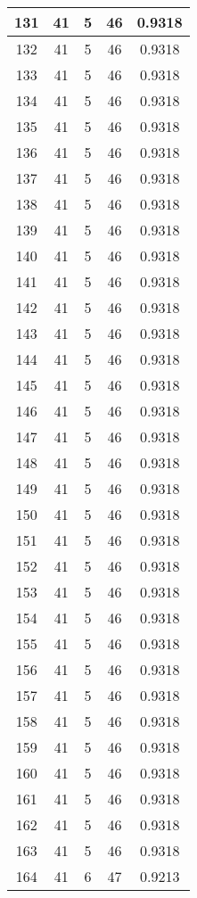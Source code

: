 \documentclass[letterpaper, 12pt]{article}
\begin{document}
\begin{longtable}{|c|c|c|c|c|}
\hline
131 & 41 & 5 & 46 & 0.9318 \\
\hline
132 & 41 & 5 & 46 & 0.9318 \\
\hline
133 & 41 & 5 & 46 & 0.9318 \\
\hline
134 & 41 & 5 & 46 & 0.9318 \\
\hline
135 & 41 & 5 & 46 & 0.9318 \\
\hline
136 & 41 & 5 & 46 & 0.9318 \\
\hline
137 & 41 & 5 & 46 & 0.9318 \\
\hline
138 & 41 & 5 & 46 & 0.9318 \\
\hline
139 & 41 & 5 & 46 & 0.9318 \\
\hline
140 & 41 & 5 & 46 & 0.9318 \\
\hline
141 & 41 & 5 & 46 & 0.9318 \\
\hline
142 & 41 & 5 & 46 & 0.9318 \\
\hline
143 & 41 & 5 & 46 & 0.9318 \\
\hline
144 & 41 & 5 & 46 & 0.9318 \\
\hline
145 & 41 & 5 & 46 & 0.9318 \\
\hline
146 & 41 & 5 & 46 & 0.9318 \\
\hline
147 & 41 & 5 & 46 & 0.9318 \\
\hline
148 & 41 & 5 & 46 & 0.9318 \\
\hline
149 & 41 & 5 & 46 & 0.9318 \\
\hline
150 & 41 & 5 & 46 & 0.9318 \\
\hline
151 & 41 & 5 & 46 & 0.9318 \\
\hline
152 & 41 & 5 & 46 & 0.9318 \\
\hline
153 & 41 & 5 & 46 & 0.9318 \\
\hline
154 & 41 & 5 & 46 & 0.9318 \\
\hline
155 & 41 & 5 & 46 & 0.9318 \\
\hline
156 & 41 & 5 & 46 & 0.9318 \\
\hline
157 & 41 & 5 & 46 & 0.9318 \\
\hline
158 & 41 & 5 & 46 & 0.9318 \\
\hline
159 & 41 & 5 & 46 & 0.9318 \\
\hline
160 & 41 & 5 & 46 & 0.9318 \\
\hline
161 & 41 & 5 & 46 & 0.9318 \\
\hline
162 & 41 & 5 & 46 & 0.9318 \\
\hline
163 & 41 & 5 & 46 & 0.9318 \\
\hline
164 & 41 & 6 & 47 & 0.9213 \\

\end{longtable}
\end{document}
